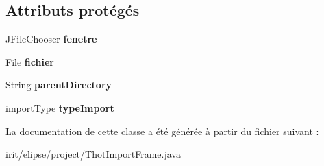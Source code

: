 \subsection*{Attributs protégés}
\begin{DoxyCompactItemize}
\item 
\mbox{\label{classfr_1_1irit_1_1elipse_1_1project_1_1_thot_import_frame_ab4eb9f29c53a6a5b6dc01260a0c40f0a}} 
J\+File\+Chooser {\bfseries fenetre}
\item 
\mbox{\label{classfr_1_1irit_1_1elipse_1_1project_1_1_thot_import_frame_a5906e39b89f1f9395e06ffb8884a8d0d}} 
File {\bfseries fichier}
\item 
\mbox{\label{classfr_1_1irit_1_1elipse_1_1project_1_1_thot_import_frame_ae58814e929459830f1b88731984f69f6}} 
String {\bfseries parent\+Directory}
\item 
\mbox{\label{classfr_1_1irit_1_1elipse_1_1project_1_1_thot_import_frame_ab49722684e589a7218ae9273cb718619}} 
import\+Type {\bfseries type\+Import}
\end{DoxyCompactItemize}


La documentation de cette classe a été générée à partir du fichier suivant \+:\begin{DoxyCompactItemize}
\item 
irit/elipse/project/Thot\+Import\+Frame.\+java\end{DoxyCompactItemize}
